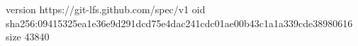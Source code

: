 version https://git-lfs.github.com/spec/v1
oid sha256:09415325ea1e36e9d291dcd75e4dac241cdc01ae00b43c1a1a339cde38980616
size 43840

